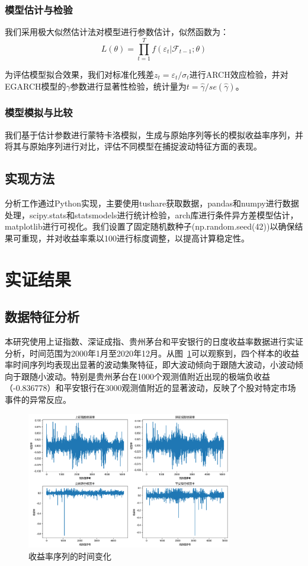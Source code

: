 \documentclass[12pt, a4paper]{article}
\begin{document}
\subsubsection{模型估计与检验}
我们采用极大似然估计法对模型进行参数估计，似然函数为：
\begin{equation}
L(\theta) = \prod_{t=1}^T f(\varepsilon_t|\mathcal{F}_{t-1};\theta)
\end{equation}

为评估模型拟合效果，我们对标准化残差$z_t = \varepsilon_t/\sigma_t$进行ARCH效应检验，并对EGARCH模型的$\gamma$参数进行显著性检验，统计量为$t = \hat{\gamma}/se(\hat{\gamma})$。

\subsubsection{模型模拟与比较}
我们基于估计参数进行蒙特卡洛模拟，生成与原始序列等长的模拟收益率序列，并将其与原始序列进行对比，评估不同模型在捕捉波动特征方面的表现。

\subsection{实现方法}
分析工作通过Python实现，主要使用tushare获取数据，pandas和numpy进行数据处理，scipy.stats和statsmodels进行统计检验，arch库进行条件异方差模型估计，matplotlib进行可视化。我们设置了固定随机数种子(np.random.seed(42))以确保结果可重现，并对收益率乘以100进行标度调整，以提高计算稳定性。

\section{实证结果}

\subsection{数据特征分析}

本研究使用上证指数、深证成指、贵州茅台和平安银行的日度收益率数据进行实证分析，时间范围为2000年1月至2020年12月。从图~\ref{fig:returns_time}可以观察到，四个样本的收益率时间序列均表现出显著的波动集聚特征，即大波动倾向于跟随大波动，小波动倾向于跟随小波动。特别是贵州茅台在1000个观测值附近出现的极端负收益（-0.836778）和平安银行在3000观测值附近的显著波动，反映了个股对特定市场事件的异常反应。

\begin{figure}[htbp]
\centering
\includegraphics[width=0.8\textwidth]{fig/returns_time.png}
\caption{收益率序列的时间变化}
\label{fig:returns_time}
\end{figure}
\end{document}
